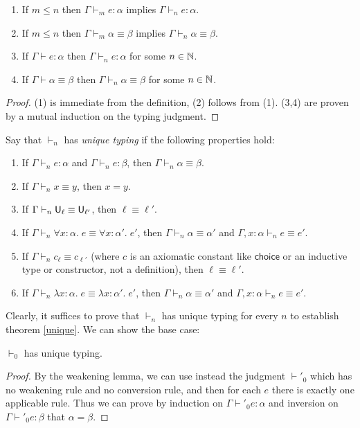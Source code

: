 \begin{lemma}
\begin{enumerate}
\item If $m\le n$ then $\Gamma\vdash_m e:\alpha$ implies $\Gamma\vdash_n e:\alpha$.
\item If $m\le n$ then $\Gamma\vdash_m\alpha\equiv\beta$ implies $\Gamma\vdash_n \alpha\equiv\beta$.
\item If $\Gamma\vdash e:\alpha$ then $\Gamma\vdash_n e:\alpha$ for some $n\in\mathbb{N}$.
\item If $\Gamma\vdash\alpha\equiv\beta$ then $\Gamma\vdash_n \alpha\equiv\beta$ for some $n\in\mathbb{N}$.
\end{enumerate}
\end{lemma}
\begin{proof}
(1) is immediate from the definition, (2) follows from (1). (3,4) are proven by a mutual induction on the typing judgment.
\end{proof}
\begin{definition}
Say that $\vdash_n$ has \emph{unique typing} if the following properties hold:
\begin{enumerate}
\item If $\Gamma\vdash_n e:\alpha$ and $\Gamma\vdash_n e:\beta$, then $\Gamma\vdash_n\alpha\equiv\beta$.
\item If $\Gamma\vdash_n x\equiv y$, then $x=y$.
\item If $\Gamma\vdash_n \U_\ell\equiv\U_{\ell'}$, then $\ell\equiv\ell'$.
\item If $\Gamma\vdash_n \forall x:\alpha.\;e\equiv\forall x:\alpha'.\;e'$, then $\Gamma\vdash_n \alpha\equiv\alpha'$ and $\Gamma,x:\alpha\vdash_n e\equiv e'$.
\item If $\Gamma\vdash_n c_{\ell}\equiv c_{\ell'}$ (where $c$ is an axiomatic constant like $\mathsf{choice}$ or an inductive type or constructor, not a definition), then $\ell\equiv\ell'$.
\item If $\Gamma\vdash_n \lambda x:\alpha.\;e\equiv\lambda x:\alpha'.\;e'$, then $\Gamma\vdash_n \alpha\equiv\alpha'$ and $\Gamma,x:\alpha\vdash_n e\equiv e'$.
\end{enumerate}
\end{definition}
Clearly, it suffices to prove that $\vdash_n$ has unique typing for every $n$ to establish theorem \ref{unique}. We can show the base case:
\begin{lemma}
$\vdash_0$ has unique typing.
\end{lemma}
\begin{proof}
By the weakening lemma, we can use instead the judgment $\vdash'_0$ which has no weakening rule and no conversion rule, and then for each $e$ there is exactly one applicable rule. Thus we can prove by induction on $\Gamma\vdash'_0 e:\alpha$ and inversion on $\Gamma\vdash'_0 e:\beta$ that $\alpha=\beta$.
\end{proof}

